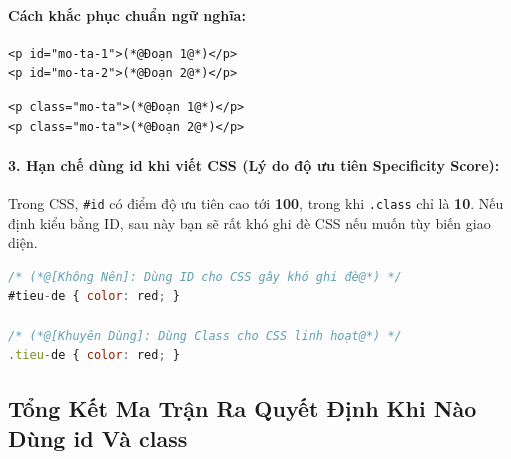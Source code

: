 \documentclass[11pt,oneside]{book}
\newcommand{\codeinline}[1]{\textcolor{accentOrange}{\texttt{#1}}}
\begin{document}
\paragraph{Cách khắc phục chuẩn ngữ nghĩa:}
\begin{codeWindow}
\begin{lstlisting}[language=HTML5]
<p id="mo-ta-1">(*@Đoạn 1@*)</p>
<p id="mo-ta-2">(*@Đoạn 2@*)</p>
\end{lstlisting}
\end{codeWindow}

\begin{codeWindow}
\begin{lstlisting}[language=HTML5]
<p class="mo-ta">(*@Đoạn 1@*)</p>
<p class="mo-ta">(*@Đoạn 2@*)</p>
\end{lstlisting}
\end{codeWindow}

\paragraph{3. Hạn chế dùng id khi viết CSS (Lý do độ ưu tiên Specificity Score):}
Trong CSS, \codeinline{\#id} có điểm độ ưu tiên cao tới \textbf{100}, trong khi \codeinline{.class} chỉ là \textbf{10}. Nếu định kiểu bằng ID, sau này bạn sẽ rất khó ghi đè CSS nếu muốn tùy biến giao diện. 
\begin{codeWindow}
\begin{lstlisting}[language=JavaScript]
/* (*@[Không Nên]: Dùng ID cho CSS gây khó ghi đè@*) */
#tieu-de { color: red; }

/* (*@[Khuyên Dùng]: Dùng Class cho CSS linh hoạt@*) */
.tieu-de { color: red; }
\end{lstlisting}
\end{codeWindow}

\subsection{Tổng Kết Ma Trận Ra Quyết Định Khi Nào Dùng id Và class}
\end{document}
